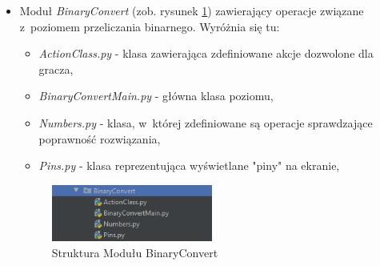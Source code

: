 \documentclass[12pt,a4paper,oneside]{book}
\theoremstyle{definition}
\numberwithin{equation}{chapter}
\begin{document}
\begin{itemize}
    \item Moduł \textit{BinaryConvert} (zob. rysunek \ref{StrukturaBinConv}) zawierający operacje związane z~poziomem przeliczania binarnego. Wyróżnia się tu:
        \begin{itemize}
            \item \textit{ActionClass.py} - klasa zawierająca zdefiniowane akcje dozwolone dla gracza,
            \item \textit{BinaryConvertMain.py} - główna klasa poziomu,
            \item \textit{Numbers.py} - klasa, w~której zdefiniowane są operacje sprawdzające poprawność rozwiązania,
            \item \textit{Pins.py} - klasa reprezentująca wyświetlane "piny" na ekranie,
        \end{itemize}
        \begin{figure}[hpt!]
            \centering
            \includegraphics[width=0.5\textwidth]{ProjectStructure/strukturabinconv.png}
            \caption{Struktura Modułu BinaryConvert}
            \label{StrukturaBinConv}
        \end{figure}
    

\end{itemize}
\end{document}
